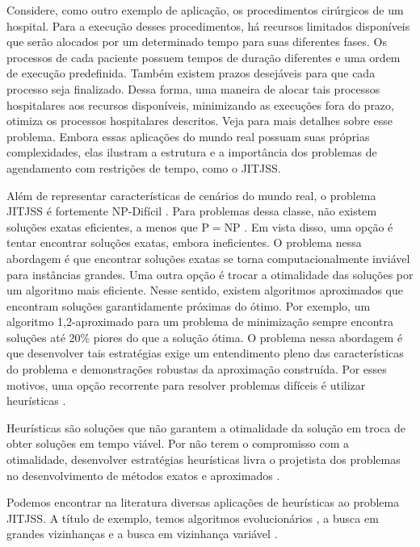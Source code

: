 Considere, como outro exemplo de aplicação, os procedimentos cirúrgicos de um hospital. Para a execução desses procedimentos, há recursos limitados disponíveis que serão alocados por um determinado tempo para suas diferentes fases. Os processos de cada paciente possuem tempos de duração diferentes e uma ordem de execução predefinida. Também existem prazos desejáveis para que cada processo seja finalizado. Dessa forma, uma maneira de alocar tais processos hospitalares aos recursos disponíveis, minimizando as execuções fora do prazo, otimiza os processos hospitalares descritos. Veja \cite{pham2008surgical} para mais detalhes sobre esse problema. Embora essas aplicações do mundo real possuam suas próprias complexidades, elas ilustram a estrutura e a importância dos problemas de agendamento com restrições de tempo, como o \ac{JITJSS}.

Além de representar características de cenários do mundo real, o problema \ac{JITJSS} é fortemente NP-Difícil \citep{du1990minimizing}. Para problemas dessa classe, não existem soluções exatas eficientes, a menos que P$=$NP \citep{cormen2022introduction}. Em vista disso, uma opção é tentar encontrar soluções exatas, embora ineficientes. O problema nessa abordagem é que encontrar soluções exatas se torna computacionalmente inviável para instâncias grandes. Uma outra opção é trocar a otimalidade das soluções por um algoritmo mais eficiente. Nesse sentido, existem algoritmos aproximados que encontram soluções garantidamente próximas do ótimo. Por exemplo, um algoritmo 1,2-aproximado para um problema de minimização sempre encontra soluções até 20\% piores do que a solução ótima. O problema nessa abordagem é que desenvolver tais estratégias exige um entendimento pleno das características do problema e demonstrações robustas da aproximação construída. Por esses motivos, uma opção recorrente para resolver problemas difíceis é utilizar heurísticas \citep{eva2005}.

Heurísticas são soluções que não garantem a otimalidade da solução em troca de obter soluções em tempo viável. Por não terem o compromisso com a otimalidade, desenvolver estratégias heurísticas livra o projetista dos problemas no desenvolvimento de métodos exatos e aproximados \citep{eva2005}.

Podemos encontrar na literatura diversas aplicações de heurísticas ao problema \ac{JITJSS}. A título de exemplo, temos algoritmos evolucionários \citep{araujo2009genetic,dos2010combination, yang2012improved}, a busca em grandes vizinhanças \citep{laborie2007self, abderrazzak2022adaptive} e a busca em vizinhança variável \citep{wang2014variable, ahmadian2021meta}.

